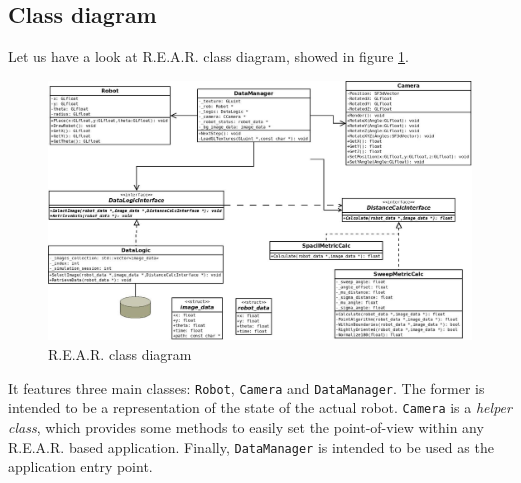 
%

%
\subsection{Class diagram}
%
Let us have a look at \textsf{R.E.A.R.} class diagram, showed in figure 
\ref {fig:class_diagram}.
%
\begin{figure}[!h]
  \begin{center}
    \includegraphics[width=400pt]{img/class_diagram.jpeg}  %
    \caption{\textsf{R.E.A.R.} class diagram}
    \label{fig:class_diagram}
  \end{center}
\end{figure}
%
It features three main classes: \texttt{Robot}, \texttt{Camera} and 
\texttt{DataManager}. The former is intended to be a
representation of the state of the actual robot. \texttt{Camera} 
is a \textit{helper class}, which provides some methods 
to easily set the point-of-view within any \textsf{R.E.A.R.}
based application. Finally, \texttt{DataManager} is intended to 
be used as the application entry point.
